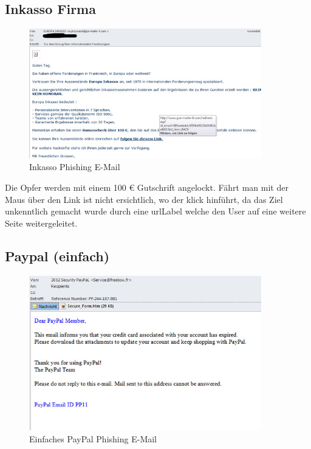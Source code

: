 \subsection{Inkasso Firma}
\begin{figure}[H]
  \centering
  \includegraphics[width=0.9\textwidth]{images/phishing-beispiel-inkasso.jpg}
  \caption{Inkasso Phishing E-Mail}
  \label{fig:phishing:beispiele:inkasso}
\end{figure}

Die Opfer werden mit einem 100 € Gutschrift angelockt. Fährt man mit der Maus über den Link ist nicht ersichtlich, wo der klick hinführt, da das Ziel unkenntlich gemacht wurde durch eine \Gls{urlLabel} welche den User auf eine weitere Seite weitergeleitet.

\subsection{Paypal (einfach)}
\begin{figure}[H]
  \centering
  \includegraphics[width=0.9\textwidth]{images/phishing-beispiel-paypal1.jpg}
  \caption{Einfaches PayPal Phishing E-Mail}
  \label{fig:phishing:beispiele:paypaleinfachmail}
\end{figure}


